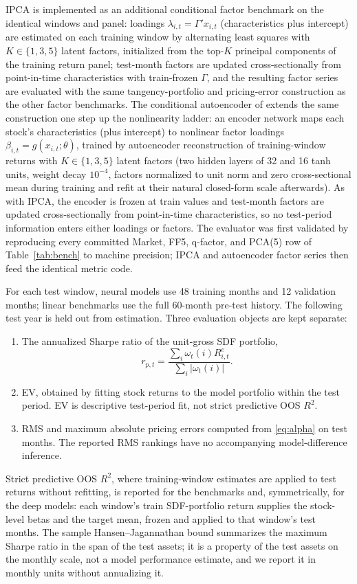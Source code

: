\documentclass[12pt]{article}
\begin{document}
IPCA \citep{kps2019} is implemented as an additional conditional factor benchmark on the identical windows and panel: loadings $\lambda_{i,t} = \Gamma' x_{i,t}$ (characteristics plus intercept) are estimated on each training window by alternating least squares with $K \in \{1, 3, 5\}$ latent factors, initialized from the top-$K$ principal components of the training return panel; test-month factors are updated cross-sectionally from point-in-time characteristics with train-frozen $\Gamma$, and the resulting factor series are evaluated with the same tangency-portfolio and pricing-error construction as the other factor benchmarks. The conditional autoencoder of \citet{gkx2021} extends the same construction one step up the nonlinearity ladder: an encoder network maps each stock's characteristics (plus intercept) to nonlinear factor loadings $\beta_{i,t} = g(x_{i,t};\theta)$, trained by autoencoder reconstruction of training-window returns with $K \in \{1, 3, 5\}$ latent factors (two hidden layers of 32 and 16 tanh units, weight decay $10^{-4}$, factors normalized to unit norm and zero cross-sectional mean during training and refit at their natural closed-form scale afterwards). As with IPCA, the encoder is frozen at train values and test-month factors are updated cross-sectionally from point-in-time characteristics, so no test-period information enters either loadings or factors. The evaluator was first validated by reproducing every committed Market, FF5, q-factor, and PCA(5) row of Table~\ref{tab:bench} to machine precision; IPCA and autoencoder factor series then feed the identical metric code.

For each test window, neural models use 48 training months and 12 validation months; linear benchmarks use the full 60-month pre-test history. The following test year is held out from estimation. Three evaluation objects are kept separate:
\begin{enumerate}
\item The annualized Sharpe ratio of the unit-gross SDF portfolio,
\begin{equation}
r_{p,t}=\frac{\sum_i\omega_t(i)R^e_{i,t}}
{\sum_i|\omega_t(i)|}.
\label{eq:portfolio}
\end{equation}
\item EV, obtained by fitting stock returns to the model portfolio within the test period. EV is descriptive test-period fit, not strict predictive OOS $R^2$.
\item RMS and maximum absolute pricing errors computed from \eqref{eq:alpha} on test months. The reported RMS rankings have no accompanying model-difference inference.
\end{enumerate}
Strict predictive OOS $R^2$, where training-window estimates are applied to test returns without refitting, is reported for the benchmarks and, symmetrically, for the deep models: each window's train SDF-portfolio return supplies the stock-level betas and the target mean, frozen and applied to that window's test months. The sample Hansen--Jagannathan bound summarizes the maximum Sharpe ratio in the span of the test assets; it is a property of the test assets on the monthly scale, not a model performance estimate, and we report it in monthly units without annualizing it.
\end{document}
